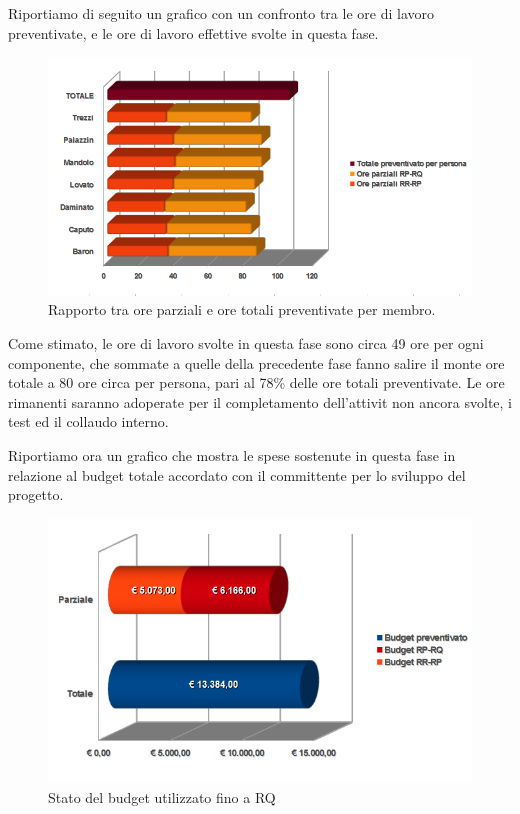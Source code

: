\newpage
Riportiamo di seguito un grafico con un confronto tra le ore di lavoro
preventivate, e le ore di lavoro effettive svolte in questa fase.

\vspace{0cm}
\begin{figure}[htbp!]
  \centering
  \includegraphics[width=17.2cm, angle=0]{img/PP/ORE-RQ.png}
\caption{Rapporto tra ore parziali e ore totali preventivate per membro.}
\end{figure}
\vspace{0.5cm}


Come stimato, le ore di lavoro svolte in questa fase sono circa 49
ore per ogni componente, che sommate a quelle della precedente fase fanno salire
il monte ore totale a 80 ore circa per persona, pari al 78\% delle ore totali
preventivate. Le ore rimanenti saranno adoperate per il completamento
dell'attivit non ancora svolte, i test ed il collaudo interno.

\newpage
Riportiamo ora un grafico che mostra le spese sostenute in questa
fase in relazione al budget totale accordato con il committente per lo sviluppo del progetto.

\vspace{0cm}
\begin{figure}[htbp!]
  \centering
  \includegraphics[width=15cm, angle=0]{img/PP/BUDGET-RQ.png}
\caption{Stato del budget utilizzato fino a RQ}
\end{figure}
\vspace{0.5cm}


